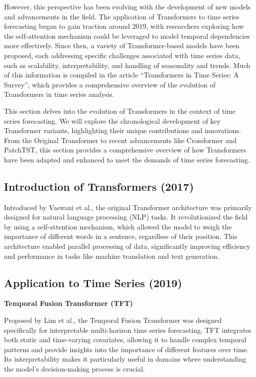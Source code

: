 However, this perspective has been evolving with the development of new models and advancements in the field. The application of Transformers to time series forecasting began to gain traction around 2019, with researchers exploring how the self-attention mechanism could be leveraged to model temporal dependencies more effectively. Since then, a variety of Transformer-based models have been proposed, each addressing specific challenges associated with time series data, such as scalability, interpretability, and handling of seasonality and trends. Much of this information is compiled in the article “Transformers in Time Series: A Survey”\cite{wen2023transformerstimeseriessurvey}, which provides a comprehensive overview of the evolution of Transformers in time series analysis.

This section delves into the evolution of Transformers in the context of time series forecasting. We will explore the chronological development of key Transformer variants, highlighting their unique contributions and innovations. From the Original Transformer to recent advancements like Crossformer and PatchTST, this section provides a comprehensive overview of how Transformers have been adapted and enhanced to meet the demands of time series forecasting.

\subsection{Introduction of Transformers (2017)}

Introduced by Vaswani et al.\cite{vaswani2023attention}, the original Transformer architecture was primarily designed for natural language processing (NLP) tasks. It revolutionized the field by using a self-attention mechanism, which allowed the model to weigh the importance of different words in a sentence, regardless of their position. This architecture enabled parallel processing of data, significantly improving efficiency and performance in tasks like machine translation and text generation.
\vspace{10pt}


\subsection{Application to Time Series (2019)}
\noindent\textbf
{Temporal Fusion Transformer (TFT)}

\noindent Proposed by Lim et al.\cite{lim2020temporalfusiontransformersinterpretable}, the Temporal Fusion Transformer was designed specifically for interpretable multi-horizon time series forecasting. TFT integrates both static and time-varying covariates, allowing it to handle complex temporal patterns and provide insights into the importance of different features over time. Its interpretability makes it particularly useful in domains where understanding the model’s decision-making process is crucial.
\vspace{10pt}


